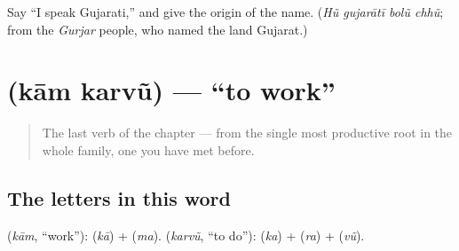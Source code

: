 \begin{tcolorbox}[breakable,colback=teal!4,colframe=teal!35!black,title={Before you move on}]
Say \textquotedblleft{}I speak Gujarati,\textquotedblright{} and give the origin of the name. (\emph{Hũ gujarātī bolũ chhũ}; from the \emph{Gurjar} people, who named the land Gujarat.)
\end{tcolorbox}
\section[\gu{કામ} \gu{કરવું}]{  (kām karvũ) — \textquotedblleft{}to work\textquotedblright{}}

\label{lesson:GU-C05-kaam-karvun}



\begin{quote}
The last verb of the chapter — from the single most productive root in the whole family, one you have met before.
\end{quote}

\subsection*{The letters in this word}
\textbf{} (\emph{kām}, \textquotedblleft{}work\textquotedblright{}): \textbf{} (\emph{kā}) + \textbf{} (\emph{ma}). \textbf{} (\emph{karvũ}, \textquotedblleft{}to do\textquotedblright{}): \textbf{} (\emph{ka}) + \textbf{} (\emph{ra}) + \textbf{} (\emph{vũ}).

